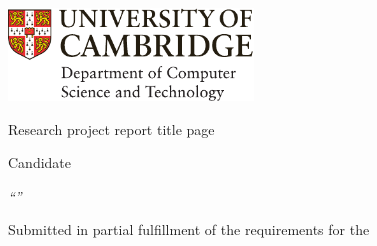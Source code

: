\ifsubmission

\begin{defaultsffamily}
\begin{titlepage}
\makeatletter

\hspace*{-14mm}\includegraphics[width=65mm]{images/logo-dcst-colour}

\begin{Large}
\vspace{20mm}
Research project report title page

\vspace{35mm}
Candidate \candidatenumber

\vspace{42mm}
\textsl{``\@title''}

\end{Large}

\vspace{\fill}
\begin{center}
Submitted in partial fulfillment of the requirements for the\\
\course
\end{center}

\makeatother
\end{titlepage}
\end{defaultsffamily}
\newpage

\else

